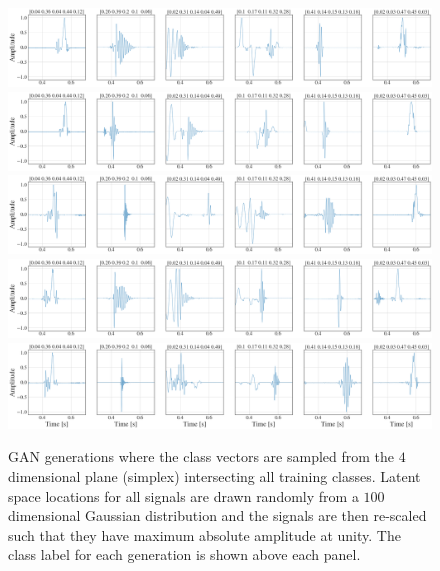 \documentclass[12pt]{iopart}
\newcommand{\ndimensional}[1]{$#1$\nobreakdash\discretionary{-}{-}{-}dimensional}
\begin{document}
\begin{figure}
    \centering
    \includegraphics[width=\textwidth]{figures/generations/simplex_sample1.png}
    \includegraphics[width=\textwidth]{figures/generations/simplex_sample2.png}
    \includegraphics[width=\textwidth]{figures/generations/simplex_sample3.png}
    \includegraphics[width=\textwidth]{figures/generations/simplex_sample4.png}
    \includegraphics[width=\textwidth]{figures/generations/simplex_sample5.png}
    \caption{GAN generations where the class vectors are sampled from the \ndimensional{4} plane (simplex) intersecting all training classes. Latent space locations for all signals are drawn randomly from a \ndimensional{100} Gaussian distribution and the signals are then re-scaled such that they have maximum absolute amplitude at unity. The class label for each generation is shown above each panel.}
    \label{fig:simplexd_samples}
\end{figure}
\end{document}
